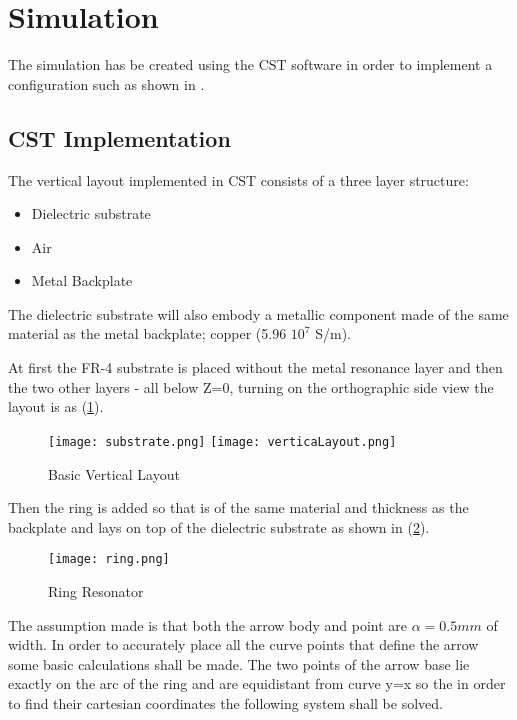 \section{\textsf{Simulation}}
    The simulation has be created using the CST software in order to implement a
    configuration such as shown in \cite{zhang_design_2023}.

    \subsection{\textsf{CST Implementation}}
        The vertical layout implemented in CST consists of a three layer structure:
        \begin{itemize}
            \item Dielectric substrate
            \item Air
            \item Metal Backplate
        \end{itemize}

        The dielectric substrate will also embody a metallic component made of the same
        material as the metal backplate; copper (5.96 \mu $10^7$ S/m).

        At first the FR-4 substrate is placed without the metal resonance layer and then
        the two other layers - all below Z=0, turning on the orthographic side view the
        layout is as (\ref{img:layout}).
        \begin{figure}[h]
            \centering
            \texttt{[image: substrate.png]}\hfil
            \texttt{[image: verticaLayout.png]}
            \caption{Basic Vertical Layout}
            \label{img:layout}
        \end{figure}

        Then the ring is added so that is of the same material and thickness as the backplate and lays
        on top of the dielectric substrate as shown in (\ref{img:ring}).
        \begin{figure}[h]
            \centering
            \texttt{[image: ring.png]}
            \caption{Ring Resonator}
            \label{img:ring}
        \end{figure}

        The assumption made is that both the arrow body and point are $\alpha=0.5mm$ of width.
        In order to accurately place all the curve points that define the arrow some basic calculations
        shall be made. The two points of the arrow base lie exactly on the arc of the ring and are 
        equidistant from curve y=x so the in order to find their cartesian coordinates the following
        system shall be solved. 

